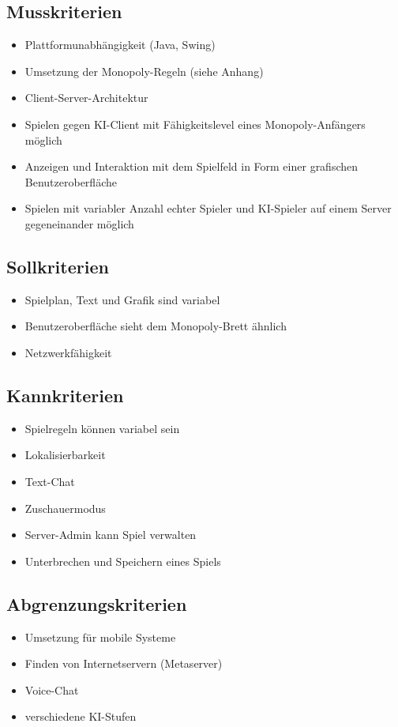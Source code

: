 \documentclass[a4paper,10pt]{article}
\begin{document}
\subsection{Musskriterien}
\begin{itemize}
\item Plattformunabhängigkeit (Java, Swing)
\item Umsetzung der Monopoly-Regeln (siehe Anhang)
\item Client-Server-Architektur
\item Spielen gegen KI-Client mit Fähigkeitslevel eines Monopoly-Anfängers möglich
\item Anzeigen und Interaktion mit dem Spielfeld in Form einer grafischen Benutzeroberfläche
\item Spielen mit variabler Anzahl echter Spieler und KI-Spieler auf einem Server gegeneinander möglich
\end{itemize}
\subsection{Sollkriterien}
\begin{itemize}
\item Spielplan, Text und Grafik sind variabel
\item Benutzeroberfläche sieht dem Monopoly-Brett ähnlich
\item Netzwerkfähigkeit
\end{itemize}
\subsection{Kannkriterien}
\begin{itemize}
\item Spielregeln können variabel sein
\item Lokalisierbarkeit
\item Text-Chat
\item Zuschauermodus
\item Server-Admin kann Spiel verwalten
\item Unterbrechen und Speichern eines Spiels
\end{itemize}
\subsection{Abgrenzungskriterien}
\begin{itemize}
\item Umsetzung für mobile Systeme 
\item Finden von Internetservern (Metaserver)
\item Voice-Chat
\item verschiedene KI-Stufen
\end{itemize}
\end{document}
